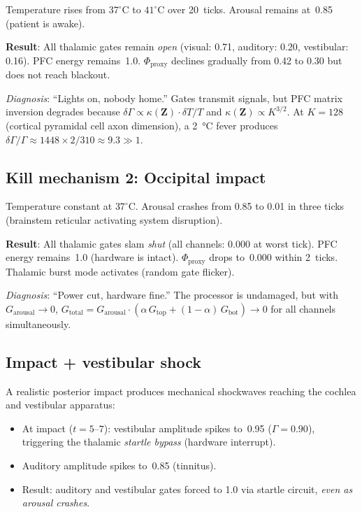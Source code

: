 \documentclass[aps,pre,twocolumn,superscriptaddress,floatfix]{revtex4-2}
\newcommand{\Zarousal}{G_{\text{arousal}}}
\begin{document}
Temperature rises from $37^\circ$C to $41^\circ$C
over 20~ticks.  Arousal remains at~0.85 (patient is awake).

\textbf{Result}: All thalamic gates remain \emph{open}
(visual: 0.71, auditory: 0.20, vestibular: 0.16).
PFC energy remains~1.0.
$\Phi_{\text{proxy}}$ declines gradually from 0.42 to 0.30
but does not reach blackout.

\emph{Diagnosis}: ``Lights on, nobody home.''
Gates transmit signals, but PFC matrix inversion degrades
because $\delta\Gamma\propto\kappa(\mathbf{Z})\cdot\delta T/T$
and $\kappa(\mathbf{Z})\propto K^{3/2}$.
At $K=128$ (cortical pyramidal cell axon dimension),
a \SI{2}{\celsius} fever produces
$\delta\Gamma/\Gamma\approx 1448\times 2/310\approx 9.3\gg 1$.

\subsection{Kill mechanism 2: Occipital impact}

Temperature constant at $37^\circ$C.
Arousal crashes from 0.85 to 0.01 in three ticks (brainstem
reticular activating system disruption).

\textbf{Result}: All thalamic gates slam \emph{shut}
(all channels: 0.000 at worst tick).
PFC energy remains~1.0 (hardware is intact).
$\Phi_{\text{proxy}}$ drops to~0.000 within 2~ticks.
Thalamic burst mode activates (random gate flicker).

\emph{Diagnosis}: ``Power cut, hardware fine.''
The processor is undamaged, but with $\Zarousal\to 0$,
$G_{\text{total}}=\Zarousal\cdot(\alpha\,G_{\text{top}}+(1-\alpha)\,G_{\text{bot}})\to 0$
for all channels simultaneously.

\subsection{Impact + vestibular shock}

A realistic posterior impact produces mechanical shockwaves
reaching the cochlea and vestibular apparatus:
\begin{itemize}
  \item At impact ($t=5$--$7$): vestibular amplitude spikes
    to~0.95 ($\Gamma=0.90$), triggering the thalamic
    \emph{startle bypass} (hardware interrupt).
  \item Auditory amplitude spikes to~0.85 (tinnitus).
  \item Result: auditory and vestibular gates forced to 1.0
    via startle circuit, \emph{even as arousal crashes}.
\end{itemize}
\end{document}
